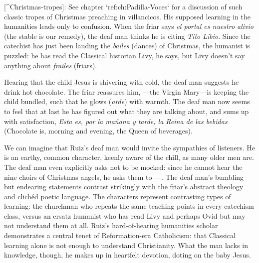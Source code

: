 [^Christmas-tropes]: See chapter `ref:ch:Padilla-Voces` for a discussion of such classic tropes of Christmas preaching in villancicos.
His supposed learning in the humanities leads only to confusion.
When the friar says \emph{el portal es nuestro alivio} (the stable is our remedy), the deaf man thinks he is citing \emph{Tito Libio}.
Since the catechist has just been lauding the \emph{bailes} (dances) of Christmas, the humanist is puzzled: he has read the Classical historian Livy, he says, but Livy doesn't say anything about \emph{frailes} (friars).

Hearing that the child Jesus is shivering with cold, the deaf man suggests he drink hot chocolate.
The friar reassures him, ---the Virgin Mary---is keeping the child bundled, such that he glows (\emph{arde}) with warmth.
The deaf man now seems to feel that at last he has figured out what they are talking about, and sums up with satisfaction, \emph{Esta es, por la mañana y tarde, la Reina de las bebidas} (Chocolate is, morning and evening, the Queen of beverages).

We can imagine that Ruiz's deaf man would invite the sympathies of listeners.
He is an earthy, common character, keenly aware of the chill, as many older men are.
The deaf man even explicitly asks not to be mocked: since he cannot hear the nine choirs of Christmas angels, he asks them to ---.
The deaf man's bumbling but endearing statements contrast strikingly with the friar's abstract theology and clichéd poetic language.
The characters represent contrasting types of learning: the churchman who repeats the same teaching points in every catechism class, versus an ersatz humanist who has read Livy and perhaps Ovid but may not understand them at all.
Ruiz's hard-of-hearing humanities scholar demonstrates a central tenet of Reformation-era Catholicism: that Classical learning alone is not enough to understand Christianity.
\Autocite[206: .]{Erasmus:Dolan}
What the man lacks in knowledge, though, he makes up in heartfelt devotion, doting on the baby Jesus.

